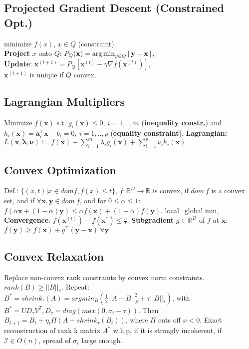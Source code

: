\subsection*{Projected Gradient Descent (Constrained Opt.)}
minimize $f(x)$, $x \in Q$ (constraint).\\
\textbf{Project} $x$ onto $Q$: $P_Q(\mathbf{x}) = \operatorname*{arg\,min}_{y \in Q} \|\mathbf{y} - \mathbf{x}\|$,\\
\textbf{Update}: $\mathbf{x}^{(t+1)} = P_Q[\mathbf{x}^{(t)} - \gamma \nabla f(\mathbf{x}^{(t)})]$,\\
$\mathbf{x}^{(t+1)}$ is unique if $Q$ convex.

\subsection*{Lagrangian Multipliers}
Minimize  $f(\mathbf{x})$ s.t. $g_i(\mathbf{x}) \leq 0,\ i = 1, .., m$ (\textbf{inequality constr.}) and $h_i(\mathbf{x}) = \mathbf{a}_i^\top \mathbf{x} - b_i = 0,\ i = 1, .., p$ (\textbf{equality constraint}). 
\textbf{Lagrangian:} $L(\mathbf{x}, \boldsymbol{\lambda}, \boldsymbol{\nu}) := f(\mathbf{x}) + \sum_{i=1}^m \lambda_i g_i(\mathbf{x}) + \sum_{i=1}^p \nu_i h_i(\mathbf{x})$\\

\subsection*{Convex Optimization}
Def.: $\{(x,t)|x \in dom f, f(x) \leq t\}$, $f : \mathbb{R}^D \rightarrow \mathbb{R}$ is convex, if $dom\ f$ is a convex set, and if $\forall \mathbf{x}, \mathbf{y} \in dom\ f$, and for $0 \leq \alpha \leq 1$: $f(\alpha \mathbf{x} + (1 - \alpha)\mathbf{y}) \leq \alpha f(\mathbf{x}) + (1-\alpha)f(\mathbf{y})$. local=global min, \textbf{Convergence}: $f(\mathbf{x}^{(t)}) - f(\mathbf{x}^*) \le \frac{c}{t}$.
\textbf{Subgradient} $g \in \mathbb{R}^D$ of $f$ at $\mathbf{x}$: $f(\mathbf{y}) \geq f(\mathbf{x}) + g^\top(\mathbf{y}-\mathbf{x}) \ \forall \mathbf{y}$

\subsection*{Convex Relaxation}
Replace non-convex rank constraints by convex norm constraints.
$rank(B) \geq ||B||_*$. Repeat: $B^* = shrink_\tau(A) = arg min_B(\frac{1}{2}||A - B||_F^2 + \tau ||B||_*)$, with $B^*=UD_\tau V^T, D_\tau = diag(max(0,\sigma_i - \tau))$. Then $B_{t+1} = B_t + \eta_t \Pi(A - shrink_\tau(B_t))$, where $\Pi$ cuts off $x < 0$. Exact reconstruction of rank k matrix $A^*$ w.h.p, if it is strongly incoherent, if $\mathcal{I} \in O(n)$, spread of $\sigma_i$ large enough. 
